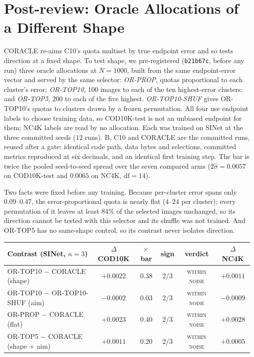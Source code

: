 \documentclass{article}
\newif\ifrevmarked \revmarkedtrue
\DeclareRobustCommand{\revB}[1]{\ifrevmarked{\color{RevB}#1}\else{#1}\fi}
\newenvironment{revblock}[1]{\ifrevmarked\color{#1}\fi}{}
\begin{document}
\section{\texorpdfstring{\revB{Post-review: Oracle Allocations of a Different Shape}}{Post-review: Oracle Allocations of a Different Shape}}
\label{app:shapeoracle}
\begin{revblock}{RevB}
CORACLE re-aims C10's quota multiset by true endpoint error and so tests direction at a fixed shape. To test shape, we
pre-registered (\texttt{b21b67c}, before any run) three oracle allocations at $N = 1000$, built from the same
endpoint-error vector and served by the same selector: \emph{OR-PROP}, quotas proportional to each cluster's error;
\emph{OR-TOP10}, $100$ images to each of the ten highest-error clusters; and \emph{OR-TOP5}, $200$ to each of the five
highest. \emph{OR-TOP10-SHUF} gives OR-TOP10's quotas to clusters drawn by a frozen permutation. All four use endpoint
labels to choose training data, so COD10K-test is not an unbiased endpoint for them; NC4K labels are read by no
allocation. Each was trained on SINet at the three committed seeds ($12$ runs). B, C10 and CORACLE are the committed
runs, reused after a gate: identical code path, data bytes and selections, committed metrics reproduced at six decimals,
and an identical first training step. The bar is twice the pooled seed-to-seed spread over the seven compared arms
($2\hat\sigma = 0.0057$ on COD10K-test and $0.0065$ on NC4K, $\mathrm{df} = 14$).

Two facts were fixed before any training. Because per-cluster error spans only $0.09$--$0.47$, the error-proportional
quota is nearly flat ($4$--$24$ per cluster); every permutation of it leaves at least $84\%$ of the selected images
unchanged, so its direction cannot be tested with this selector and its shuffle was not trained. And OR-TOP5 has no
same-shape control, so its contrast never isolates direction.

\begin{center}\small
\begin{tabular}{@{}lccccc@{}}
\toprule
Contrast (SINet, $n = 3$) & $\Delta$ COD10K & $\times$\,bar & sign & verdict & $\Delta$ NC4K \\
\midrule
OR-TOP10 $-$ CORACLE (shape) & $+0.0022$ & $0.38$ & 2/3 & \textsc{within noise} & $+0.0011$ \\
OR-TOP10 $-$ OR-TOP10-SHUF (aim) & $-0.0002$ & $0.03$ & 2/3 & \textsc{within noise} & $-0.0009$ \\
OR-PROP $-$ CORACLE (flat) & $+0.0023$ & $0.40$ & 2/3 & \textsc{within noise} & $+0.0028$ \\
OR-TOP5 $-$ CORACLE (shape + aim) & $+0.0011$ & $0.20$ & 2/3 & \textsc{within noise} & $+0.0005$ \\
\bottomrule
\end{tabular}
\end{center}


\end{revblock}
\end{document}

